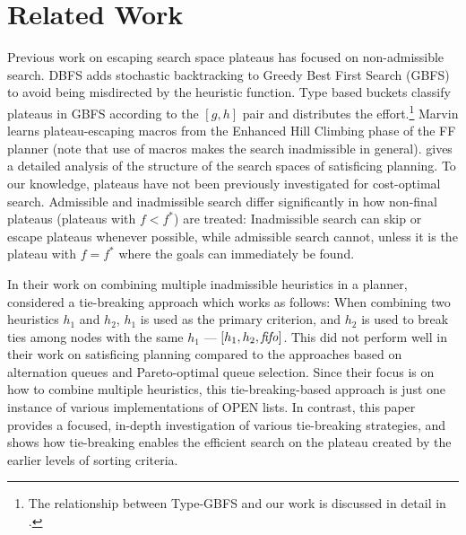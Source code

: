
\section{Related Work}

Previous work on escaping search space plateaus has focused on
non-admissible search.  DBFS \cite{imai2011novel} %
adds stochastic backtracking to Greedy Best First Search (GBFS) to avoid
being misdirected by the heuristic function. Type based buckets
\cite{xie14type} classify plateaus in GBFS according to the
$[g,h]$ pair and distributes the effort.\footnote{The relationship between Type-GBFS and our work is discussed in detail in .}  Marvin \cite{Coles07} learns plateau-escaping macros
from the Enhanced Hill Climbing phase of the FF planner
\cite{Hoffmann01} (note that use of macros makes the search inadmissible in general).
\citeauthor{Hoffmann05} \citeyear{Hoffmann05,Hoffmann11} gives a detailed analysis of the
structure of the search spaces of satisficing planning.
% 
To our knowledge, plateaus have not been previously investigated for cost-optimal search.
Admissible and inadmissible search differ significantly in how non-final plateaus (plateaus with $f < f^*$) are treated:
Inadmissible search can skip or escape plateaus whenever possible, while
admissible search cannot, unless it is the plateau with $f=f^*$ where the goals can immediately be found.

In their work on combining multiple inadmissible heuristics in a planner,
\citeauthor{RogerH10} \citeyear{RogerH10} considered a tie-breaking approach which works as follows:
When combining two heuristics $h_1$ and $h_2$, $h_1$ is used as the primary criterion,
and $h_2$ is used to break ties among nodes with the same $h_1$ --- $[h_1,h_2,{\text{\textit{fifo}}}]$.
This did not perform well in their work on satisficing planning compared to the approaches based on alternation queues and Pareto-optimal queue selection.
% 
Since their focus is on how to combine multiple heuristics,
this tie-breaking-based approach is just one instance of various implementations of OPEN lists.
In contrast, this paper provides a focused, in-depth investigation of various tie-breaking strategies,
and shows 
how tie-breaking enables the efficient search on the plateau created by the earlier levels of sorting criteria.

